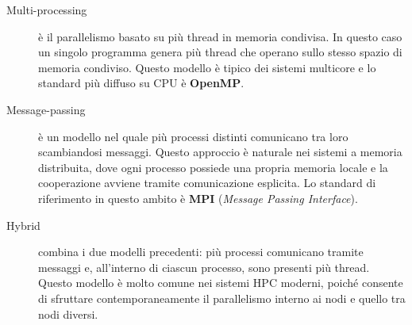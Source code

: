 \begin{description}
    \item[Multi-processing] è il parallelismo basato su più thread in memoria condivisa. In questo caso un singolo programma genera più thread che operano sullo stesso spazio di memoria condiviso. Questo modello è tipico dei sistemi multicore e lo standard più diffuso su CPU è \textbf{OpenMP}.
    
    \item[Message-passing] è un modello nel quale più processi distinti comunicano tra loro scambiandosi messaggi. Questo approccio è naturale nei sistemi a memoria distribuita, dove ogni processo possiede una propria memoria locale e la cooperazione avviene tramite comunicazione esplicita. Lo standard di riferimento in questo ambito è \textbf{MPI} (\emph{Message Passing Interface}).
    
    \item[Hybrid] combina i due modelli precedenti: più processi comunicano tramite messaggi e, all'interno di ciascun processo, sono presenti più thread. Questo modello è molto comune nei sistemi HPC moderni, poiché consente di sfruttare contemporaneamente il parallelismo interno ai nodi e quello tra nodi diversi.
\end{description}